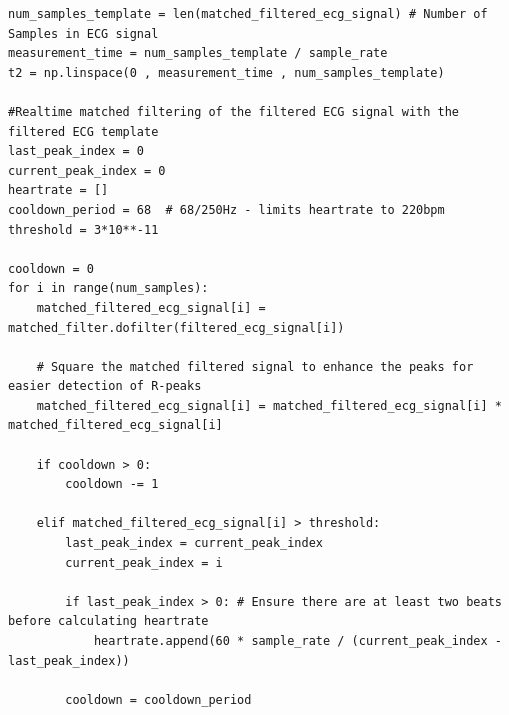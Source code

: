 \documentclass[8pt]{extarticle}
\begin{document}
\begin{verbatim}
num_samples_template = len(matched_filtered_ecg_signal) # Number of Samples in ECG signal
measurement_time = num_samples_template / sample_rate
t2 = np.linspace(0 , measurement_time , num_samples_template)

#Realtime matched filtering of the filtered ECG signal with the filtered ECG template
last_peak_index = 0
current_peak_index = 0
heartrate = []
cooldown_period = 68  # 68/250Hz - limits heartrate to 220bpm
threshold = 3*10**-11

cooldown = 0
for i in range(num_samples):
    matched_filtered_ecg_signal[i] = matched_filter.dofilter(filtered_ecg_signal[i])

    # Square the matched filtered signal to enhance the peaks for easier detection of R-peaks
    matched_filtered_ecg_signal[i] = matched_filtered_ecg_signal[i] * matched_filtered_ecg_signal[i]

    if cooldown > 0:
        cooldown -= 1

    elif matched_filtered_ecg_signal[i] > threshold:
        last_peak_index = current_peak_index        
        current_peak_index = i

        if last_peak_index > 0: # Ensure there are at least two beats before calculating heartrate
            heartrate.append(60 * sample_rate / (current_peak_index - last_peak_index))

        cooldown = cooldown_period
\end{verbatim}
\end{document}
